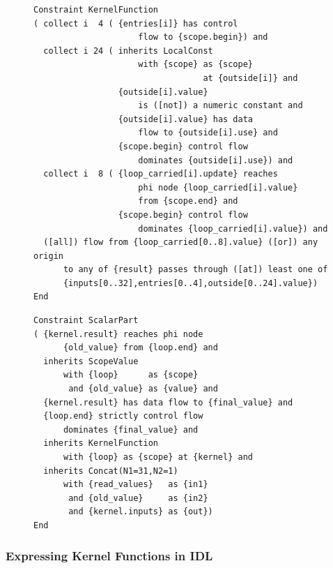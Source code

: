 \begin{figure}[p]
\begin{lstlisting}[language=IDL]
Constraint KernelFunction
( collect i  4 ( {entries[i]} has control
                     flow to {scope.begin}) and
  collect i 24 ( inherits LocalConst
                     with {scope} as {scope}
                                  at {outside[i]} and
                 {outside[i].value}
                     is ([not]) a numeric constant and
                 {outside[i].value} has data
                     flow to {outside[i].use} and
                 {scope.begin} control flow
                     dominates {outside[i].use}) and
  collect i  8 ( {loop_carried[i].update} reaches
                     phi node {loop_carried[i].value}
                     from {scope.end} and
                 {scope.begin} control flow
                     dominates {loop_carried[i].value}) and
  ([all]) flow from {loop_carried[0..8].value} ([or]) any origin
      to any of {result} passes through ([at]) least one of
      {inputs[0..32],entries[0..4],outside[0..24].value})
End
\end{lstlisting}
\begin{lstlisting}[language=IDL,label={IDLscalarPart},caption=
   {IDL specifications of a kernel function and a scalar reduction within a
    CReHC:
    In ``{\tt ScalarPart}'', the kernel function operates in a loop.
    Its input ``\texttt{kernel.inputs}'' is composed of
    ``\texttt{read\_values}'' and the reduction value of the previous iteration,
    concatenated with ``\texttt{Concat}''.}]
Constraint ScalarPart
( {kernel.result} reaches phi node
      {old_value} from {loop.end} and
  inherits ScopeValue
      with {loop}      as {scope}
       and {old_value} as {value} and
  {kernel.result} has data flow to {final_value} and
  {loop.end} strictly control flow
      dominates {final_value} and
  inherits KernelFunction
      with {loop} as {scope} at {kernel} and
  inherits Concat(N1=31,N2=1)
      with {read_values}   as {in1}
       and {old_value}     as {in2}
       and {kernel.inputs} as {out})
End
\end{lstlisting}
\end{figure}

\subsubsection{Expressing Kernel Functions in IDL}

